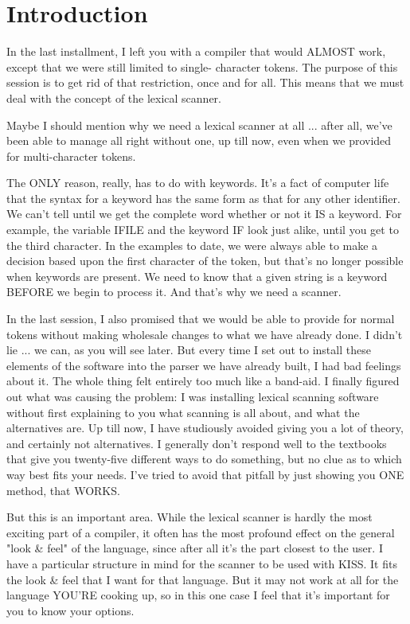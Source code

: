 \documentclass[float=false, crop=false]{standalone}
\begin{document}
\section{Introduction}

In the last installment, I left you with a compiler that would ALMOST work,
except that we were still limited to single- character tokens. The purpose of
this session is to get rid of that restriction, once and for all. This means
that we must deal with the concept of the lexical scanner.

Maybe I should mention why we need a lexical scanner at all ... after all, we've
been able to manage all right without one, up till now, even when we provided
for multi-character tokens.

The ONLY reason, really, has to do with keywords. It's a fact of computer life
that the syntax for a keyword has the same form as that for any other
identifier. We can't tell until we get the complete word whether or not it IS a
keyword. For example, the variable IFILE and the keyword IF look just alike,
until you get to the third character. In the examples to date, we were always
able to make a decision based upon the first character of the token, but that's
no longer possible when keywords are present. We need to know that a given
string is a keyword BEFORE we begin to process it. And that's why we need a
scanner.

In the last session, I also promised that we would be able to provide for normal
tokens without making wholesale changes to what we have already done. I didn't
lie ... we can, as you will see later. But every time I set out to install these
elements of the software into the parser we have already built, I had bad
feelings about it. The whole thing felt entirely too much like a band-aid. I
finally figured out what was causing the problem: I was installing lexical
scanning software without first explaining to you what scanning is all about,
and what the alternatives are. Up till now, I have studiously avoided giving you
a lot of theory, and certainly not alternatives. I generally don't respond well
to the textbooks that give you twenty-five different ways to do something, but
no clue as to which way best fits your needs. I've tried to avoid that pitfall
by just showing you ONE method, that WORKS.

But this is an important area. While the lexical scanner is hardly the most
exciting part of a compiler, it often has the most profound effect on the
general "look \& feel" of the language, since after all it's the part closest to
the user. I have a particular structure in mind for the scanner to be used with
KISS. It fits the look \& feel that I want for that language. But it may not work
at all for the language YOU'RE cooking up, so in this one case I feel that it's
important for you to know your options.
\end{document}
